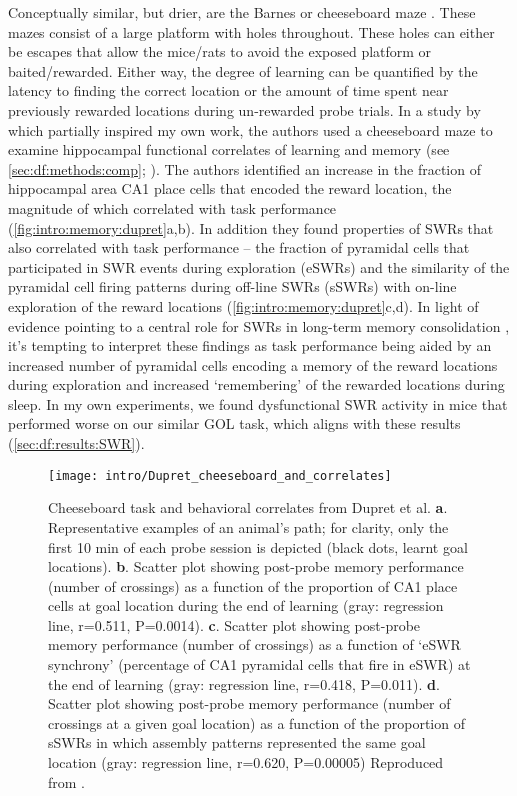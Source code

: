Conceptually similar, but drier, are the Barnes or cheeseboard maze \citep{Barnes1979, Kesner1991, Dupret2010a}.
These mazes consist of a large platform with holes throughout.
These holes can either be escapes that allow the mice/rats to avoid the exposed platform or baited/rewarded.
Either way, the degree of learning can be quantified by the latency to finding the correct location or the amount of time spent near previously rewarded locations during un-rewarded probe trials.
In a study by \citeauthor{Dupret2010a} which partially inspired my own work, the authors used a cheeseboard maze to examine hippocampal functional correlates of learning and memory (see \autoref{sec:df:methods:comp}; \citealp{Dupret2010a}).
The authors identified an increase in the fraction of hippocampal area CA1 place cells that encoded the reward location, the magnitude of which correlated with task performance (\autoref{fig:intro:memory:dupret}a,b).
In addition they found properties of \acp{SWR} that also correlated with task performance -- the fraction of pyramidal cells that participated in \ac{SWR} events during exploration (eSWRs) and the similarity of the pyramidal cell firing patterns during off-line \acp{SWR} (sSWRs) with on-line exploration of the reward locations (\autoref{fig:intro:memory:dupret}c,d).
In light of evidence pointing to a central role for SWRs in long-term memory consolidation \citep{Buzsaki2015}, it's tempting to interpret these findings as task performance being aided by an increased number of pyramidal cells encoding a memory of the reward locations during exploration and increased `remembering' of the rewarded locations during sleep.
In my own experiments, we found dysfunctional \ac{SWR} activity in mice that performed worse on our similar \ac{GOL} task, which aligns with these results (\autoref{sec:df:results:SWR}).

\begin{figure}
	\centering
	\texttt{[image: intro/Dupret\_cheeseboard\_and\_correlates]}
	\caption[Cheeseboard task and behavioral correlates from Dupret et al.]{Cheeseboard task and behavioral correlates from Dupret et al.
	\textbf{a}. Representative examples of an animal's path; for clarity, only the first 10 min of each probe session is depicted (black dots, learnt goal locations).
	\textbf{b}. Scatter plot showing post-probe memory performance (number of crossings) as a function of the proportion of CA1 place cells at goal location during the end of learning (gray: regression line, r=0.511, P=0.0014).
	\textbf{c}. Scatter plot showing post-probe memory performance (number of crossings) as a function of `eSWR synchrony' (percentage of CA1 pyramidal cells that fire in eSWR) at the end of learning (gray: regression line, r=0.418, P=0.011).
	\textbf{d}. Scatter plot showing post-probe memory performance (number of crossings at a given goal location) as a function of the proportion of sSWRs in which assembly patterns represented the same goal location (gray: regression line, r=0.620, P=0.00005)
	Reproduced from \citet{Dupret2010a}.}
	\label{fig:intro:memory:dupret}
\end{figure}

